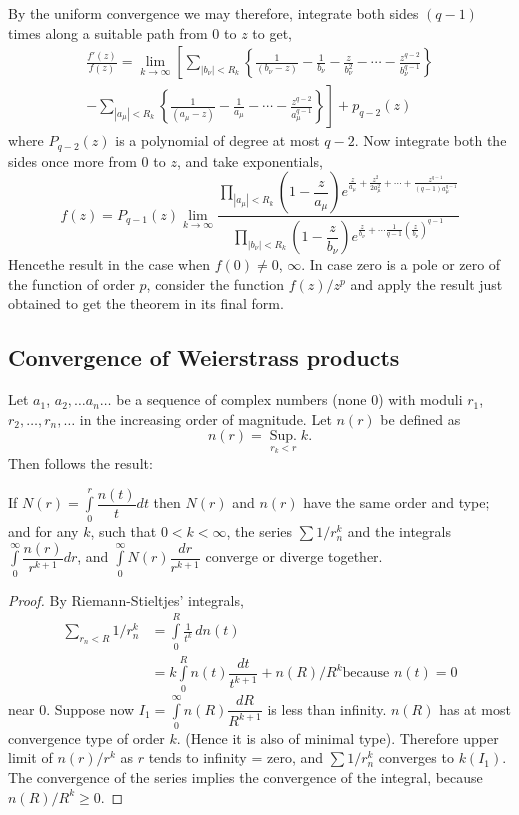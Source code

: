 By the uniform convergence we may therefore, integrate both sides
$(q-1)$ times along a suitable path from $0$ to $z$ to get,
\begin{multline*}
\frac{f'(z)}{f(z)}=\lim\limits_{k\to\infty}\left[\sum_{|b_{\nu}|<R_{k}}\left\{\frac{1}{(b_{\nu}-z)}-\frac{1}{b_{\nu}}-\frac{z}{b_{\nu}^{2}}-\cdots-\frac{z^{q-2}}{b^{q-1}_{\nu}}\right\}\right.\\
\left. -\sum_{|a_{\mu}|<R_{k}}\left\{\frac{1}{(a_{\mu}-z)}-\frac{1}{a_{\mu}}-\cdots-\frac{z^{q-2}}{a_{\mu}^{q-1}}\right\}\right]+p_{q-2}(z)
\end{multline*}
where $P_{q-2}(z)$ is a polynomial of degree at most $q-2$. Now
integrate both the sides once more from $0$ to $z$, and take
exponentials,
$$
f(z)=P_{q-1}(z)\lim\limits_{k\to
  \infty}\frac{\prod\limits_{|a_{\mu}|<R_{k}}
  \left(1-\dfrac{z}{a_{\mu}}\right) e^{\frac{z}{a_{\mu}} +
    \frac{z^{2}}{2a^{2}_{\mu}}+\cdots+\frac{z^{q-1}}{(q-1)a^{q-1}_{\mu}}}}
{\prod\limits_{|b_{\nu}| <R_{k}} \left(1-\dfrac{z}{b_{\nu}}\right)
  e^{\frac{z}{b_{\nu}} + \cdots\frac{1}{q-1}\left(\frac{z}{b_{\nu}}\right)^{q-1}}} 
$$
Hence\pageoriginale the result in the case when $f(0)\neq 0$,
$\infty$. In case zero is a pole or zero of the function of order $p$,
consider the function $f(z)/z^{p}$ and apply the result just obtained
to get the theorem in its final form.

\subsection{Convergence of Weierstrass
  products}\label{part1-sec1.9}\pageoriginale 

Let $a_{1}$, $a_{2},\ldots a_{n}\ldots$ be a sequence of complex
numbers (none $0$) with moduli $r_{1}$, $r_{2},\ldots,r_{n},\ldots$ in
the increasing order of magnitude. Let $n(r)$ be defined as
$$
n(r)=\mathop{\text{Sup.}}\limits_{r_{k}<r}k.
$$
Then follows the result:

\begin{lemma*}
If $N(r)=\int\limits^{r}_{0}\dfrac{n(t)}{t}dt$ then $N(r)$ and $n(r)$
have the same order and type; and for any $k$, such that $0<k<\infty$,
the series $\sum 1/r^{k}_{n}$ and the integrals
$\int\limits^{\infty}_{0}\dfrac{n(r)}{r^{k+1}}dr$, and
$\int\limits^{\infty}_{0}N(r)\dfrac{dr}{r^{k+1}}$ converge or diverge
together.
\end{lemma*}

\begin{proof}
By Riemann-Stieltjes' integrals,
\begin{align*}
\sum_{r_{n}<R}1/r_{n}^{k} &= \int\limits^{R}_{0}\frac{1}{t^{k}} \,dn (t)\\
&= k\int\limits^{R}_{0}n(t)\dfrac{dt}{t^{k+1}}+n(R)/R^{k} \text{
  \ because \ } n(t)=0
\end{align*}
near $0$. Suppose now
$I_{1}=\int\limits^{\infty}_{0}n(R)\dfrac{dR}{R^{k+1}}$ is less than
infinity. $n(R)$ has at most convergence type of order $k$. (Hence it
is also of minimal type). Therefore upper limit of $n(r)/r^{k}$ as $r$
tends to infinity =  zero, and $\sum 1/r^{k}_{n}$ converges to
$k(I_{1})$. The convergence of the series implies the convergence of
the integral, because $n(R)/R^{k}\geq 0$.
\end{proof}


